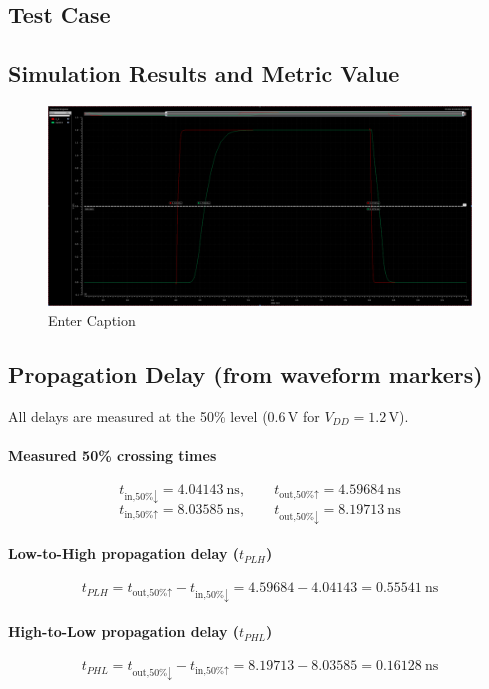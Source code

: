\documentclass[12pt]{article}
\begin{document}
\newpage

\subsection{Test Case}



\newpage

\subsection{Simulation Results and Metric Value}

\begin{figure}[H]
    \centering
    \includegraphics[width=0.5\linewidth]{writeup//figures/optimized_delay_transient.png}
    \caption{Enter Caption}
\end{figure}

\subsection*{Propagation Delay (from waveform markers)}

All delays are measured at the 50\% level (\(0.6\,\text{V}\) for \(V_{DD}=1.2\,\text{V}\)).

\paragraph{Measured 50\% crossing times}
\[
t_{\text{in,50\%}\downarrow}=4.04143~\text{ns}, \qquad
t_{\text{out,50\%}\uparrow}=4.59684~\text{ns}
\]
\[
t_{\text{in,50\%}\uparrow}=8.03585~\text{ns}, \qquad
t_{\text{out,50\%}\downarrow}=8.19713~\text{ns}
\]

\paragraph{Low-to-High propagation delay (\(t_{PLH}\))}
\[
t_{PLH}=t_{\text{out,50\%}\uparrow}-t_{\text{in,50\%}\downarrow}
      =4.59684-4.04143
      =\boxed{0.55541~\text{ns}}
\]

\paragraph{High-to-Low propagation delay (\(t_{PHL}\))}
\[
t_{PHL}=t_{\text{out,50\%}\downarrow}-t_{\text{in,50\%}\uparrow}
      =8.19713-8.03585
      =\boxed{0.16128~\text{ns}}
\]
\end{document}
